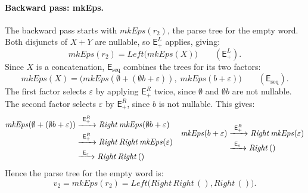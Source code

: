 \paragraph{Backward pass: mkEps.}
The backward pass starts with $\mathit{mkEps}(r_2)$, 
the parse tree for the empty word. 
Both disjuncts of $X + Y$ are nullable, so $\mathsf{E}_{+}^{L}$ applies, giving:
\[
\mathit{mkEps}(r_2)
  = \mathit{Left}\bigl(\mathit{mkEps}(X)\bigr)
  \qquad (\mathsf{E}_{+}^{L}).
\]
Since $X$ is a concatenation,
$\mathsf{E}_{\mathrm{seq}}$ combines the trees for its two factors:
\[
\mathit{mkEps}(X)
  = \bigl(\mathit{mkEps}(\emptyset+(\emptyset b+\varepsilon)),\;
           \mathit{mkEps}(b+\varepsilon)\bigr)
  \qquad (\mathsf{E}_{\mathrm{seq}}).
\]
The first factor selects $\varepsilon$ by applying $\mathsf{E}_{+}^{R}$ twice, 
since $\emptyset$ and $\emptyset b$ are not nullable.
The second factor selects $\varepsilon$ by $\mathsf{E}_{+}^{R}$, 
since $b$ is not nullable. This gives:
\[
\begin{array}{@{}c@{\hspace{1em}}c@{}}
\begin{aligned}
\mathit{mkEps}(\emptyset+(\emptyset b+\varepsilon))
  &\xrightarrow{\ \mathsf{E}_{+}^{R}\ }
    \mathit{Right}\,\mathit{mkEps}(\emptyset b+\varepsilon)\\
  &\xrightarrow{\ \mathsf{E}_{+}^{R}\ }
    \mathit{Right}\,\mathit{Right}\,\mathit{mkEps}(\varepsilon)\\
  &\xrightarrow{\ \mathsf{E}_{\varepsilon}\ }
    \mathit{Right}\,\mathit{Right}\,()
\end{aligned}
&
\begin{aligned}
\mathit{mkEps}(b+\varepsilon)
  &\xrightarrow{\ \mathsf{E}_{+}^{R}\ }
    \mathit{Right}\,\mathit{mkEps}(\varepsilon)\\
  &\xrightarrow{\ \mathsf{E}_{\varepsilon}\ }
    \mathit{Right}\,()
\end{aligned}
\end{array}
\]
Hence the parse tree for the empty word is:
\[
v_2 = \mathit{mkEps}(r_2)
    = \mathit{Left}\bigl(
        \mathit{Right}\,\mathit{Right}\,(),
        \mathit{Right}\,()
      \bigr).
\]

%

\clearpage
